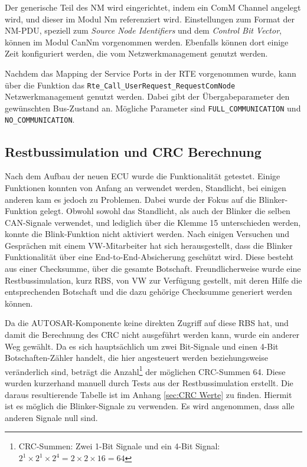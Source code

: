\documentclass[
  a4paper,					    %
  twoside,
  DIV=calc,     				%
  bibliography=totoc,
  cleardoublepage=empty,
  ngerman,     					%
  final       					%
]{scrbook}
\begin{document}
Der generische Teil des NM wird eingerichtet, indem ein ComM Channel angelegt wird, und dieser im Modul Nm referenziert wird. Einstellungen zum Format der NM-PDU, speziell zum \emph{Source Node Identifiers} und dem \emph{Control Bit Vector}, können im Modul CanNm vorgenommen werden. Ebenfalls können dort einige Zeit konfiguriert werden, die vom Netzwerkmanagement genutzt werden.

Nachdem das Mapping der Service Ports in der RTE vorgenommen wurde, kann über die Funktion das \texttt{Rte\_Call\_UserRequest\_RequestComNode} Netzwerkmanagement genutzt werden. Dabei gibt der Übergabeparameter den gewünschten Bus-Zustand an. Mögliche Parameter sind \texttt{FULL\_COMMUNICATION} und \texttt{NO\_COMMUNICATION}.




\subsection{Restbussimulation und CRC Berechnung}
\label{sec:RBS}
Nach dem Aufbau der neuen ECU wurde die Funktionalität getestet. Einige Funktionen konnten von Anfang an verwendet werden, Standlicht, bei einigen anderen kam es jedoch zu Problemen. Dabei wurde der Fokus auf die Blinker-Funktion gelegt. Obwohl sowohl das Standlicht, als auch der Blinker die selben CAN-Signale verwendet, und lediglich über die Klemme 15 unterschieden werden, konnte die Blink-Funktion nicht aktiviert werden. Nach einigen Versuchen und Gesprächen mit einem VW-Mitarbeiter hat sich herausgestellt, dass die Blinker Funktionalität über eine End-to-End-Absicherung geschützt wird. Diese besteht aus einer Checksumme, über die gesamte Botschaft. Freundlicherweise wurde eine Restbussimulation, kurz RBS, von VW zur Verfügung gestellt, mit deren Hilfe die entsprechenden Botschaft und die dazu gehörige Checksumme generiert werden können. 

Da die AUTOSAR-Komponente keine direkten Zugriff auf diese RBS hat, und damit die Berechnung des CRC nicht ausgeführt werden kann, wurde ein anderer Weg gewählt. Da es sich hauptsächlich um zwei Bit-Signale und einen 4-Bit Botschaften-Zähler handelt, die hier angesteuert werden beziehungsweise veränderlich sind, beträgt die Anzahl\footnote{CRC-Summen: Zwei 1-Bit Signale und ein 4-Bit Signal: $ 2^1 \times 2^1 \times 2^4 = 2 \times 2 \times 16 = 64 $} der möglichen CRC-Summen 64. Diese wurden kurzerhand manuell durch Tests aus der Restbussimulation erstellt. Die daraus resultierende Tabelle ist im Anhang \ref{sec:CRC Werte} zu finden. Hiermit ist es möglich die Blinker-Signale zu verwenden. Es wird angenommen, dass alle anderen Signale null sind.
\end{document}
